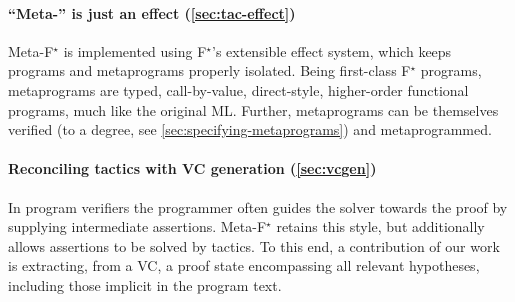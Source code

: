 \documentclass[runningheads]{llncs}
\newcommand\fstar{F$^\star$\xspace}
\newcommand\metafstar{Meta-F$^\star$\xspace}
\newcommand{\comm}[3]{\ifcheckpagebudget\else\ifdraft{{\color{#1}[#2: #3]}}\fi\fi}
\newcommand{\ch}[1]{\comm{teal}{CH}{#1}}
\newcommand{\guido}[1]{\comm{blue}{Guido}{#1}}
\newcommand{\da}[1]{\comm{dkyellow}{Danel}{#1}}
\begin{document}
%

\paragraph*{\bf ``Meta-'' is just an effect (\autoref{sec:tac-effect})}
%
%
\metafstar is implemented using \fstar's extensible effect
system, which keeps programs and
metaprograms properly isolated.
%
%
Being first-class \fstar programs, metaprograms
are typed, call-by-value, direct-style, higher-order functional
programs, much like the original ML.
%
Further, metaprograms can be themselves verified (to a degree, see
\autoref{sec:specifying-metaprograms}) and metaprogrammed.


\paragraph*{\bf Reconciling tactics with VC generation (\autoref{sec:vcgen})}
%
In program verifiers the programmer often guides
the solver towards the proof by supplying intermediate 
assertions. \metafstar retains this style,
but additionally allows assertions to be solved by 
tactics. To this end, a contribution of
our work is extracting, from a VC, a proof state
encompassing all relevant hypotheses, including those implicit
in the program text.
%
\end{document}
